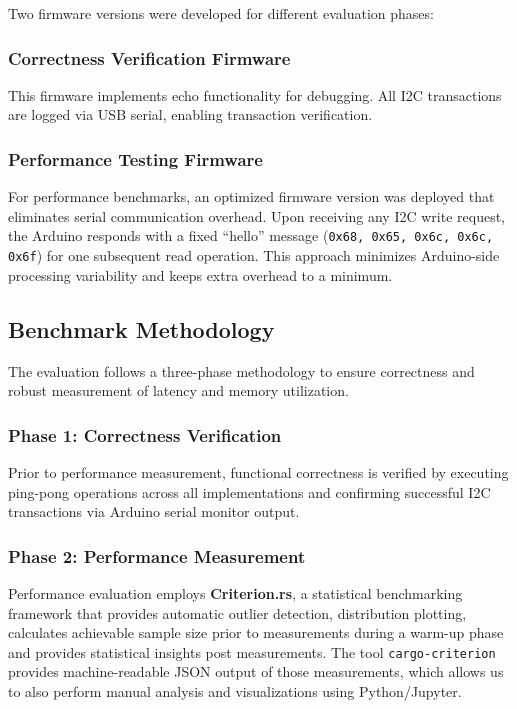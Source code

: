 Two firmware versions were developed for different evaluation phases:

\subsubsection{Correctness Verification Firmware}
This firmware implements echo functionality for debugging. All I2C transactions are logged via USB serial, enabling transaction verification.

\subsubsection{Performance Testing Firmware}
For performance benchmarks, an optimized firmware version was deployed that eliminates serial communication overhead. Upon receiving any I2C write request, the Arduino responds with a fixed ``hello'' message (\texttt{0x68, 0x65, 0x6c, 0x6c, 0x6f}) for one subsequent read operation. This approach minimizes Arduino-side processing variability and keeps extra overhead to a minimum.

\subsection{Benchmark Methodology}
\label{subsec:eval-setup-bench}

The evaluation follows a three-phase methodology to ensure correctness and robust measurement of latency and memory utilization.

\subsubsection{Phase 1: Correctness Verification}
Prior to performance measurement, functional correctness is verified by executing ping-pong operations across all implementations and confirming successful I2C transactions via Arduino serial monitor output.

\subsubsection{Phase 2: Performance Measurement}
Performance evaluation employs \textbf{Criterion.rs}, a statistical benchmarking framework that provides automatic outlier detection, distribution plotting, calculates achievable sample size prior to measurements during a warm-up phase and provides statistical insights post measurements\cite{criterion_rs}. The tool \texttt{cargo-criterion} provides machine-readable JSON output of those measurements, which allows us to also perform manual analysis and visualizations using Python/Jupyter.

